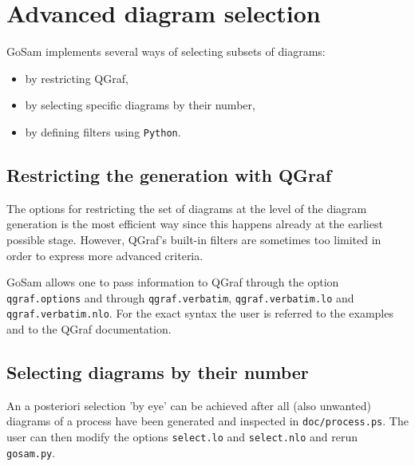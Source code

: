 \documentclass[11pt,a4paper]{refrep}
\newcommand{\gosamversion}{{3{.}0}}
\newcommand{\gosamv}[1][\gosamversion]{{\sc GoSam}\xspace}
\newcommand{\python}{{\tt Python}\xspace}
\begin{document}

\chapter{Advanced diagram selection}
\gosamv implements several ways of selecting subsets of diagrams:
\begin{itemize}
\item by restricting QGraf,
\item by selecting specific diagrams by their number,
\item by defining filters using \python.
\end{itemize}

\section{Restricting the generation with QGraf}
The options for restricting the set of diagrams at the level
of the diagram generation is the most efficient way since this
happens already at the earliest possible stage.
However, QGraf's built-in filters are sometimes
too limited in order to express more advanced criteria.

\gosamv{} allows one to pass information to QGraf through the option
\texttt{qgraf.options} and through \texttt{qgraf.verbatim},
\texttt{qgraf.verbatim.lo} and \texttt{qgraf.verbatim.nlo}.
For the exact syntax the user is referred to the examples and 
to the QGraf documentation.

\section{Selecting diagrams by their number}
An a posteriori selection 'by eye' can be achieved after all (also unwanted)
diagrams of a process have been generated and inspected in
\texttt{doc/process.ps}. The user can then modify the options
\texttt{select.lo} and \texttt{select.nlo} and rerun \texttt{gosam.py}.
\end{document}
